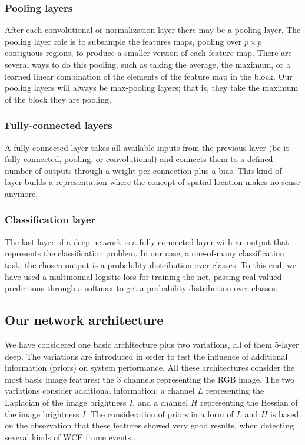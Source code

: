 \documentclass[review,12pt,3p]{elsarticle}
\begin{document}
\subsubsection{Pooling layers}
After each convolutional or normalization layer there may be a pooling layer. The pooling layer role is to subsample the features maps, pooling over $p \times p$ contiguous regions, to produce a smaller version of each feature map. There are several ways to do this pooling, such as taking the average, the maximum, or a learned linear combination of the elements of the feature map in the block. Our pooling layers will always be max-pooling layers; that is, they take the maximum of the block they are pooling.

\subsubsection{Fully-connected layers}
A fully-connected layer takes all available inputs from the previous layer (be it fully connected, pooling, or convolutional) and connects them to a defined number of outputs through a weight per connection plus a bias. This kind of layer builds a representation where the concept of spatial location makes no sense anymore.

\subsubsection{Classification layer}
The last layer of a deep network is a fully-connected layer with an output that represents the classification problem. In our case, a one-of-many classification task, the chosen output is a probability distribution over classes. To this end, we have used a multinomial logistic loss for training the net, passing real-valued predictions through a softmax to get a probability distribution over classes.


\subsection{Our network architecture}
\label{subsec1}

We have considered one basic architecture plus two variations, all of them 5-layer deep. The variations are introduced in order to test the influence of additional information (priors) on system performance. All these architectures consider the most basic image  features: the 3 channels representing the RGB image. The two variations consider additional information: a channel $L$ representing the Laplacian of the image brightness $I$, and a channel $H$ representing the Hessian of the image brightness $I$. The consideration of priors in a form of $L$ and $H$ is based on the observation that these features showed very good results, when detecting several kinds of WCE frame events \cite{sseguiWrinkles, sseguiTurbid}.
\end{document}
